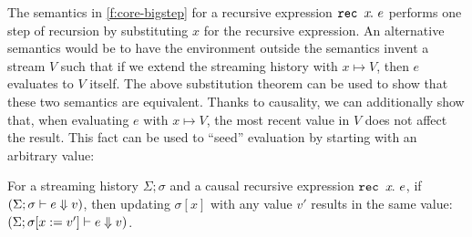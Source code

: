 The semantics in \autoref{f:core-bigstep} for a recursive expression $\texttt{rec~} x\hspace{-0.1em}.~e$ performs one step of recursion by substituting $x$ for the recursive expression.
An alternative semantics would be to have the environment outside the semantics invent a stream $V$ such that if we extend the streaming history with $x \mapsto V$, then $e$ evaluates to $V$ itself.
The above substitution theorem can be used to show that these two semantics are equivalent.
Thanks to causality, we can additionally show that, when evaluating $e$ with $x \mapsto V$, the most recent value in $V$ does not affect the result.
This fact can be used to ``seed'' evaluation by starting with an arbitrary value:
\begin{theorem}
  For a streaming history $\Sigma; \sigma$ and a causal recursive expression $\texttt{rec~} x\hspace{-0.1em}.~e$, if $(\Sigma; \sigma \vdash e \Downarrow v)$, then updating $\sigma[x]$ with any value $v'$ results in the same value: $(\Sigma; \sigma[x := v'] \vdash e \Downarrow v)$.
\end{theorem}

